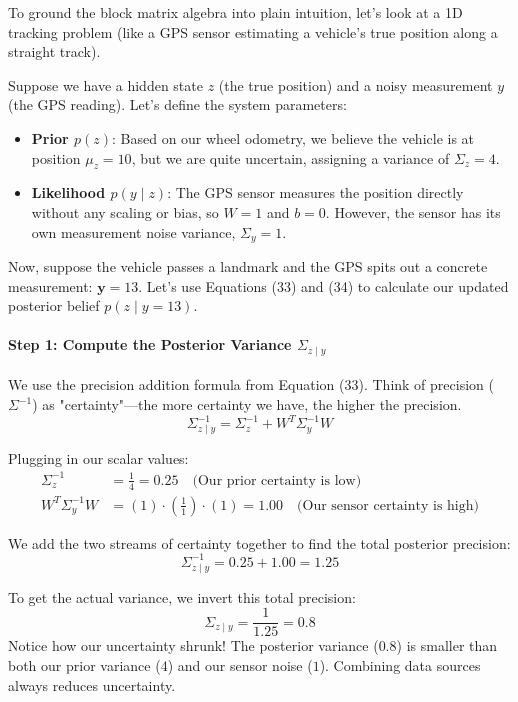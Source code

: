 \documentclass{article}
\begin{document}
To ground the block matrix algebra into plain intuition, let's look at a 1D tracking problem (like a GPS sensor estimating a vehicle's true position along a straight track). 

Suppose we have a hidden state $z$ (the true position) and a noisy measurement $y$ (the GPS reading). Let's define the system parameters:
\begin{itemize}
    \item \textbf{Prior $p(z)$}: Based on our wheel odometry, we believe the vehicle is at position $\mu_z = 10$, but we are quite uncertain, assigning a variance of $\Sigma_z = 4$.
    \item \textbf{Likelihood $p(y \mid z)$}: The GPS sensor measures the position directly without any scaling or bias, so $W = 1$ and $b = 0$. However, the sensor has its own measurement noise variance, $\Sigma_y = 1$.
\end{itemize}

Now, suppose the vehicle passes a landmark and the GPS spits out a concrete measurement: $\mathbf{y} = 13$. Let's use Equations (33) and (34) to calculate our updated posterior belief $p(z \mid y = 13)$.

\paragraph{Step 1: Compute the Posterior Variance $\Sigma_{z \mid y}$}
We use the precision addition formula from Equation (33). Think of precision ($\Sigma^{-1}$) as "certainty"—the more certainty we have, the higher the precision.
\begin{equation*}
\Sigma_{z \mid y}^{-1} = \Sigma_z^{-1} + W^T \Sigma_y^{-1} W
\end{equation*}

Plugging in our scalar values:
\begin{align*}
\Sigma_z^{-1} &= \frac{1}{4} = 0.25 \quad \text{(Our prior certainty is low)} \\
W^T \Sigma_y^{-1} W &= (1) \cdot \left(\frac{1}{1}\right) \cdot (1) = 1.00 \quad \text{(Our sensor certainty is high)}
\end{align*}

We add the two streams of certainty together to find the total posterior precision:
\begin{equation*}
\Sigma_{z \mid y}^{-1} = 0.25 + 1.00 = 1.25
\end{equation*}

To get the actual variance, we invert this total precision:
\begin{equation}
\Sigma_{z \mid y} = \frac{1}{1.25} = 0.8 \tag{35}
\end{equation}
Notice how our uncertainty shrunk! The posterior variance ($0.8$) is smaller than both our prior variance ($4$) and our sensor noise ($1$). Combining data sources always reduces uncertainty.
\end{document}
